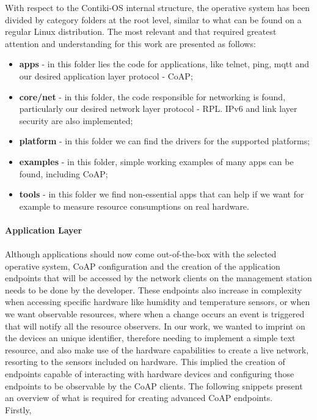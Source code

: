 With respect to the Contiki-OS internal structure, the operative system has been divided by category folders at the root level, similar to what can be found on a regular Linux distribution. The most relevant and that required greatest attention and understanding for this work are presented as follows:

\begin{itemize}
	\item \textbf{apps} - in this folder lies the code for applications, like telnet, ping, mqtt and our desired application layer protocol - \gls{CoAP};
	\item \textbf{core/net} - in this folder, the code responsible for networking is found, particularly our desired network layer protocol - RPL. IPv6 and link layer security are also implemented;
	\item \textbf{platform} - in this folder we can find the drivers for the supported platforms;
	\item \textbf{examples} - in this folder, simple working examples of many apps can be found, including \gls{CoAP};
	\item \textbf{tools} - in this folder we find non-essential apps that can help if we want for example to measure resource consumptions on real hardware.
\end{itemize}

\paragraph{\textbf{Application Layer}}
\paragraph{}

Although applications should now come out-of-the-box with the selected operative system, \gls{CoAP} configuration and the creation of the application endpoints that will be accessed by the network clients on the management station needs to be done by the developer. These endpoints also increase in complexity when accessing specific hardware like humidity and temperature sensors, or when we want observable resources, where when a change occurs an event is triggered that will notify all the resource observers. In our work, we wanted to imprint on the devices an unique identifier, therefore needing to implement a simple text resource, and also make use of the hardware capabilities to create a live network, resorting to the sensors included on hardware. This implied the creation of endpoints capable of interacting with hardware devices and configuring those endpoints to be observable by the \gls{CoAP} clients. The following snippets present an overview of what is required for creating advanced \gls{CoAP} endpoints.\\
Firstly, 

